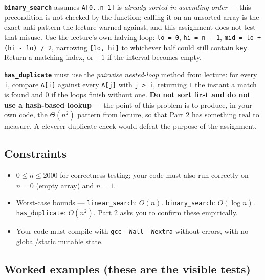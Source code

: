 \documentclass[11pt]{article}
\begin{document}
\textbf{\texttt{binary\_search}} assumes \texttt{A[0..n-1]} is \emph{already sorted in ascending order} --- this precondition is not checked by the function; calling it on an unsorted array is the exact anti-pattern the lecture warned against, and this assignment does not test that misuse. Use the lecture's own halving loop: \texttt{lo = 0}, \texttt{hi = n - 1}, \texttt{mid = lo + (hi - lo) / 2}, narrowing \texttt{[lo, hi]} to whichever half could still contain \texttt{key}. Return a matching index, or $-1$ if the interval becomes empty.

\textbf{\texttt{has\_duplicate}} must use the \emph{pairwise nested-loop} method from lecture: for every \texttt{i}, compare \texttt{A[i]} against every \texttt{A[j]} with \texttt{j > i}, returning $1$ the instant a match is found and $0$ if the loops finish without one. \textbf{Do not sort first and do not use a hash-based lookup} --- the point of this problem is to produce, in your own code, the $\Theta(n^2)$ pattern from lecture, so that Part 2 has something real to measure. A cleverer duplicate check would defeat the purpose of the assignment.

\subsection{Constraints}

\begin{itemize}
  \item $0 \leq n \leq 2000$ for correctness testing; your code must also run correctly on $n = 0$ (empty array) and $n = 1$.
  \item Worst-case bounds --- \texttt{linear\_search}: $O(n)$. \texttt{binary\_search}: $O(\log n)$. \texttt{has\_duplicate}: $O(n^2)$. Part 2 asks you to confirm these empirically.
  \item Your code must compile with \texttt{gcc -Wall -Wextra} without errors, with no global/static mutable state.
\end{itemize}

\subsection{Worked examples (these are the visible tests)}
\end{document}
